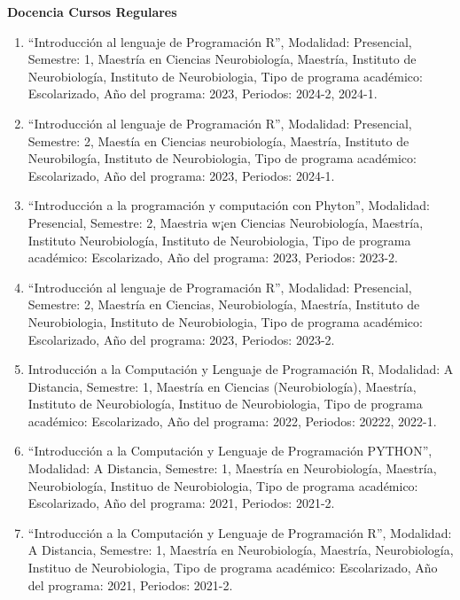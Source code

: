 \textbf{Docencia Cursos Regulares}

\hfill

\begin{enumerate}

\item “Introducción al lenguaje de Programación R”, Modalidad: Presencial, Semestre: 1, Maestría en Ciencias 
Neurobiología, Maestría, Instituto de Neurobiología, Instituto de Neurobiologia, Tipo de programa académico: Escolarizado, 
Año del programa: 2023, Periodos: 2024-2, 2024-1.

\item “Introducción al lenguaje de Programación R”, Modalidad: Presencial, Semestre: 2, Maestía en Ciencias neurobiología, 
Maestría, Instituto de Neurobilogía, Instituto de Neurobiologia, Tipo de programa académico: Escolarizado, Año del 
programa: 2023, Periodos: 2024-1.

\item “Introducción a la programación y computación con Phyton”, Modalidad: Presencial, Semestre: 2, Maestria w¡en Ciencias 
Neurobiología, Maestría, Instituto Neurobiología, Instituto de Neurobiologia, Tipo de programa académico: Escolarizado, Año 
del programa: 2023, Periodos: 2023-2.

\item “Introducción al lenguaje de Programación R”, Modalidad: Presencial, Semestre: 2, Maestría en Ciencias, Neurobiología, 
Maestría, Instituto de Neurobiologia, Instituto de Neurobiologia, Tipo de programa académico: Escolarizado, Año del 
programa: 2023, Periodos: 2023-2.

\item Introducción a la Computación y Lenguaje de Programación R, Modalidad: A Distancia, Semestre: 1, Maestría en Ciencias 
(Neurobiología), Maestría, Instituto de Neurobiología, Instituo de Neurobiologia, Tipo de programa académico: Escolarizado, 
Año del programa: 2022, Periodos: 20222, 2022-1.

\item “Introducción a la Computación y Lenguaje de Programación PYTHON”, Modalidad: A Distancia, Semestre: 1, Maestría en 
Neurobiología, Maestría, Neurobiología, Instituo de Neurobiologia, Tipo de programa académico: Escolarizado, Año del 
programa: 2021, Periodos: 2021-2.

\item “Introducción a la Computación y Lenguaje de Programación R”, Modalidad: A Distancia, Semestre: 1, Maestría en 
Neurobiología, Maestría, Neurobiología, Instituo de Neurobiologia, Tipo de programa académico: Escolarizado, Año del 
programa: 2021, Periodos: 2021-2.


\end{enumerate}
